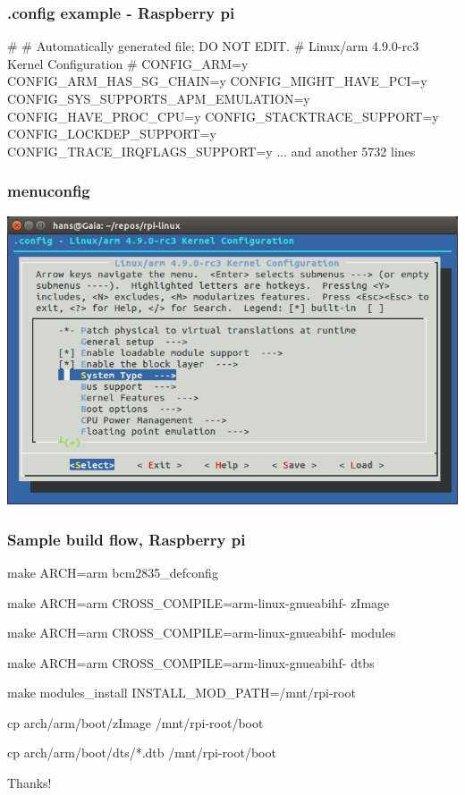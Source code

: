 \documentclass{beamer}
\begin{document}
\begin{frame}[fragile]
\frametitle{.config example - Raspberry pi}
\begin{semiverbatim}
#
# Automatically generated file; DO NOT EDIT.
# Linux/arm 4.9.0-rc3 Kernel Configuration
#
CONFIG_ARM=y
CONFIG_ARM_HAS_SG_CHAIN=y
CONFIG_MIGHT_HAVE_PCI=y
CONFIG_SYS_SUPPORTS_APM_EMULATION=y
CONFIG_HAVE_PROC_CPU=y
CONFIG_STACKTRACE_SUPPORT=y
CONFIG_LOCKDEP_SUPPORT=y
CONFIG_TRACE_IRQFLAGS_SUPPORT=y
... and another 5732 lines
\end{semiverbatim}
\end{frame}

\begin{frame}
\frametitle{menuconfig}
\includegraphics[width=\textwidth]{menuconfig.png}
\end{frame}

\begin{frame}[fragile]
\frametitle{Sample build flow, Raspberry pi}
\begin{semiverbatim}
\item make ARCH=arm bcm2835_defconfig
\item make ARCH=arm CROSS_COMPILE=arm-linux-gnueabihf- zImage
\item make ARCH=arm CROSS_COMPILE=arm-linux-gnueabihf- modules
\item make ARCH=arm CROSS_COMPILE=arm-linux-gnueabihf- dtbs
\item make modules_install INSTALL_MOD_PATH=/mnt/rpi-root
\item cp arch/arm/boot/zImage /mnt/rpi-root/boot
\item cp arch/arm/boot/dts/*.dtb /mnt/rpi-root/boot
\end{semiverbatim}
\end{frame}

\begin{frame}
\Huge{\centerline{Thanks!}}
\end{frame}
\end{document}
